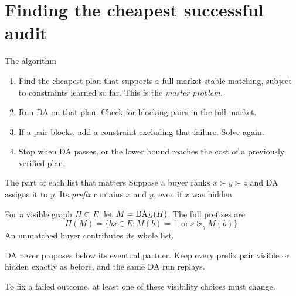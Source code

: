 \section{Finding the cheapest successful audit}
\begin{frame}[t,label=solver]{The algorithm}
\small
\begin{enumerate}
\setlength{\itemsep}{9pt}
\item Find the cheapest plan that supports a full-market stable matching,
subject to constraints learned so far. This is the \emph{master problem}.
\item Run DA on that plan. Check for blocking pairs in the full market.
\item If a pair blocks, add a constraint excluding that failure. Solve again.
\item Stop when DA passes, or the lower bound reaches the cost of a
previously verified plan.
\end{enumerate}
\end{frame}

\begin{frame}[t,label=prefix]{The part of each list that matters}
\small
Suppose a buyer ranks $x\succ y\succ z$ and DA assigns it to $y$.
Its \emph{prefix} contains $x$ and $y$, even if $x$ was hidden.

For a visible graph $H\subseteq E$, let $M=\operatorname{DA}_{B}(H)$. The full prefixes are
\[
 \Pi(M)=\{bs\in E:M(b)=\bot\ \text{or}\ s\succeq_b M(b)\}.
\]
An unmatched buyer contributes its whole list.

\medskip
DA never proposes below its eventual partner. Keep every prefix pair
visible or hidden exactly as before, and the same DA run replays.

\medskip
To fix a failed outcome, at least one of these visibility choices must change.
\end{frame}

